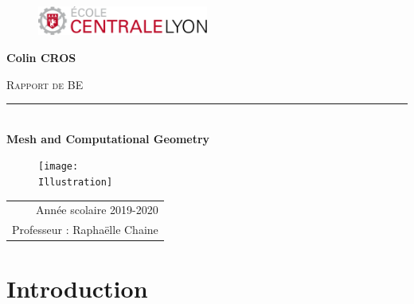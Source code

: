\documentclass[12pt,a4paper,twoside]{report}
\newcommand{\Surtitre}{Rapport de BE}
\newcommand{\TitreRapport}{\textbf{Mesh and Computational Geometry}}
\newcommand{\DateStage}{Année scolaire 2019-2020}
\newcommand{\Eleve}{Colin CROS}
\newcommand{\Professeur}{Raphaëlle Chaine}
\newcommand{\Illustration}{illustration}
\begin{document}
	


\thispagestyle{empty} %
\noindent %


\begin{center}

	\begin{figure}[H]
	\includegraphics[width=0.5\textwidth]{centrale_lyon}
	\end{figure}
	\vspace{5\baselineskip}
	
	\begin{center}
	{\Large \textbf{\Eleve}} \\ 
	\end{center}
	
	\vfill
	
	{\Large \textsc{\Surtitre}} \\
	\rule{9.5cm}{0.2pt} \\ %
	\vspace{1\baselineskip} %
	{\LARGE \TitreRapport}
	\begin{figure}[H]
	\centering
	\texttt{[image: \\Illustration]}
	\end{figure}

	
	\vfill
	\begin{table}[h!]
		\centering
		\begin{tabular}{r} %
		\DateStage \\
		Professeur : \Professeur\\
		\end{tabular}
	\end{table}
			
\end{center}

\newpage

\newpage\section*{Introduction}
\end{document}
